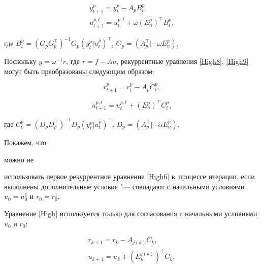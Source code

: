 \begin{gather}

y^{p}_{t+1}=y^{p}_{t}-A_{p}B^{p}_{t},

\label{High8}

\\

u^{p,t}_{t+1}=u^{p,t}_{t}+\omega (E^{p}_{n})^{\top}B^{p}_{t},

\label{High9}

\end{gather}

где $B^{p}_{t}=(G_{p}G^{\top}_{p})^{-1}G_{p}(y^{p}_{t}|u^{p}_{t})^{\top}$, $G_{p}=(A^{\top}_{p}|-\omega E^{p}_{n})$.



Поскольку $y=\omega^{-1}r$, где $r=f-Au$, рекуррентные уравнения \eqref{High8}, \eqref{High9} могут быть преобразованы следующим образом:

\begin{equation}

r^{p}_{t+1}=r^{p}_{t}-A_{p}C^{p}_{t},

\label{High10}

\end{equation}

\begin{equation}

u^{p,t}_{t+1}=u^{p,t}_{t}+(E^{p}_{n})^{\top}C^{p}_{t},

\label{High11}

\end{equation}

где $C^{p}_{t}=(D_{p}D^{\top}_{p})^{-1}D_{p}(y^{p}_{t}|u^{p}_{t})^{\top}$, $D_{p}=(A^{\top}_{p}|-\alpha E^{p}_{n})$.



Покажем, что %

можно не

использовать первое рекуррентное уравнение \eqref{High6} в~процессе итерации, если выполнены дополнительные условия "--- совпадают с начальными условиями $u_{0}=u^{1}_{0}$ и $r_{0}=r^{1}_{0}$. 

Уравнение \eqref{High} используется только для согласования c начальными условиями $u_{0}$ и $r_{0}$:

\begin{gather}

r_{k+1}=r_{k}-A_{j(k)}C_{k},

\label{High12}

\\

u_{k+1}=u_{k}+(E^{j(k)}_{n})^{\top}C_{k},

\label{High13}

\end{gather}

